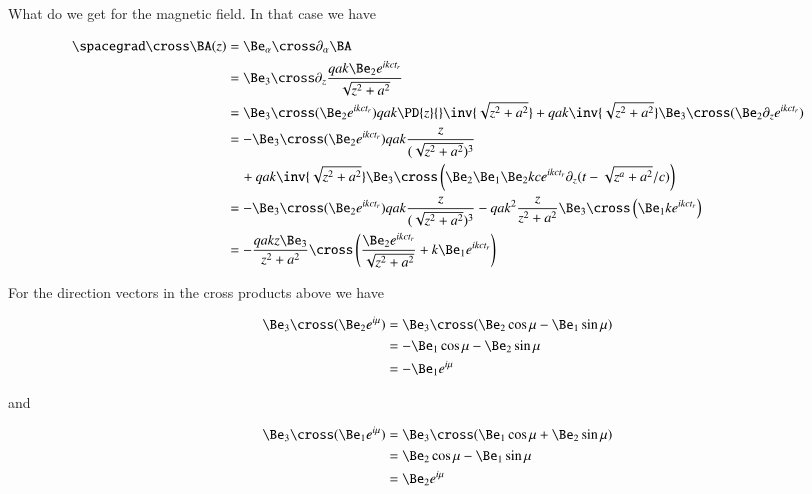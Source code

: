 {What do we get for the magnetic field.  In that case we have

\begin{equation}\label{eqn:relativisticElectrodynamicsExamReflection:1190}
\begin{aligned}
\spacegrad \cross \BA(z)
&=
\Be_\alpha \cross \partial_\alpha \BA \\
&=
\Be_3 \cross \partial_z \frac{q a k \Be_2 e^{i k c t_r} }{\sqrt{z^2 + a^2}}  \\
&=
\Be_3 \cross (\Be_2 e^{i  k c t_r} ) q a  k \PD{z}{} \inv{\sqrt{z^2 + a^2}}
+
q a  k \inv{\sqrt{z^2 + a^2}} \Be_3 \cross (\Be_2 \partial_z e^{i  k c t_r} ) \\
&=
-\Be_3 \cross (\Be_2 e^{i  k c t_r} ) q a  k \frac{z}{(\sqrt{z^2 + a^2})^3} \\
&\quad +
q a  k \inv{\sqrt{z^2 + a^2}} \Be_3 \cross \left( \Be_2 \Be_1 \Be_2 k c e^{i  k c t_r} \partial_z ( t - \sqrt{z^a + a^2}/c ) \right) \\
&=
-\Be_3 \cross (\Be_2 e^{i  k c t_r} ) q a  k \frac{z}{(\sqrt{z^2 + a^2})^3}
-
q a  k^2 \frac{z}{z^2 + a^2} \Be_3 \cross \left( \Be_1 k e^{i  k c t_r} \right) \\
&=
-\frac{q a k z \Be_3}{z^2 + a^2} \cross \left(
\frac{ \Be_2 e^{i k c t_r} }{\sqrt{z^2 + a^2}} + k \Be_1 e^{i k c t_r}
\right)
\end{aligned}
\end{equation}

For the direction vectors in the cross products above we have

\begin{equation}\label{eqn:relativisticElectrodynamicsExamReflection:1210}
\begin{aligned}
\Be_3 \cross (\Be_2 e^{i \mu})
&=
\Be_3 \cross (\Be_2 \cos\mu - \Be_1 \sin\mu) \\
&=
-\Be_1 \cos\mu - \Be_2 \sin\mu \\
&=
-\Be_1 e^{i \mu}
\end{aligned}
\end{equation}

and

\begin{equation}\label{eqn:relativisticElectrodynamicsExamReflection:1230}
\begin{aligned}
\Be_3 \cross (\Be_1 e^{i \mu})
&=
\Be_3 \cross (\Be_1 \cos\mu + \Be_2 \sin\mu) \\
&=
\Be_2 \cos\mu - \Be_1 \sin\mu \\
&=
\Be_2 e^{i \mu}
\end{aligned}
\end{equation}

}
